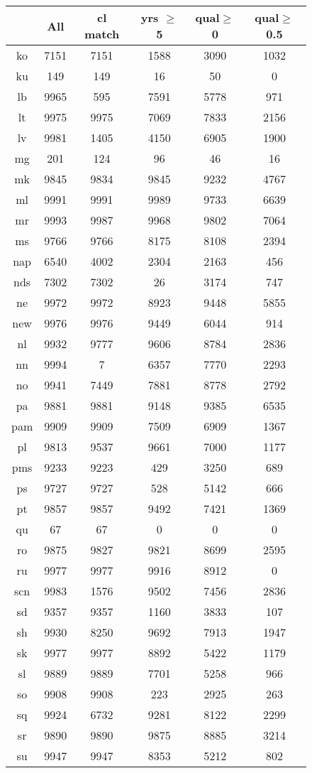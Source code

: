 \begin{figure}[h]
\centering
\begin{tabular}{cccccc}
&All&cl match&yrs $\geq$ 5&qual$\geq$0&qual$\geq$0.5\\
\hline\hline
ko&7151&7151&1588&3090&1032\\
ku&149&149&16&50&0\\
lb&9965&595&7591&5778&971\\
lt&9975&9975&7069&7833&2156\\
lv&9981&1405&4150&6905&1900\\
mg&201&124&96&46&16\\
mk&9845&9834&9845&9232&4767\\
ml&9991&9991&9989&9733&6639\\
mr&9993&9987&9968&9802&7064\\
ms&9766&9766&8175&8108&2394\\
nap&6540&4002&2304&2163&456\\
nds&7302&7302&26&3174&747\\
ne&9972&9972&8923&9448&5855\\
new&9976&9976&9449&6044&914\\
nl&9932&9777&9606&8784&2836\\
nn&9994&7&6357&7770&2293\\
no&9941&7449&7881&8778&2792\\
pa&9881&9881&9148&9385&6535\\
pam&9909&9909&7509&6909&1367\\
pl&9813&9537&9661&7000&1177\\
pms&9233&9223&429&3250&689\\
ps&9727&9727&528&5142&666\\
pt&9857&9857&9492&7421&1369\\
qu&67&67&0&0&0\\
ro&9875&9827&9821&8699&2595\\
ru&9977&9977&9916&8912&0\\
scn&9983&1576&9502&7456&2836\\
sd&9357&9357&1160&3833&107\\
sh&9930&8250&9692&7913&1947\\
sk&9977&9977&8892&5422&1179\\
sl&9889&9889&7701&5258&966\\
so&9908&9908&223&2925&263\\
sq&9924&6732&9281&8122&2299\\
sr&9890&9890&9875&8885&3214\\
su&9947&9947&8353&5212&802\\

\end{tabular}
\end{figure}
